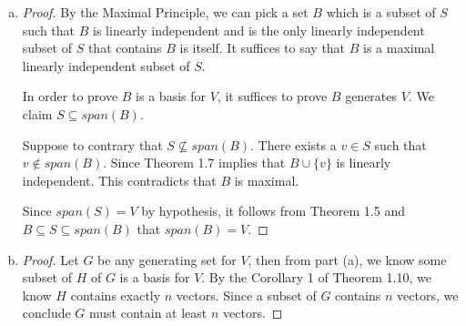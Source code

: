 \begin{Exercise}
	\begin{enumerate}[(a)]
		\item
		\begin{proof}
			By the Maximal Principle, we can pick a set $B$ which is a subset of $S$ such that $B$ is linearly independent and is the only linearly independent subset of $S$ that contains $B$ is itself. It suffices to say that $B$ is a maximal linearly independent subset of $S$.
			
			In order to prove $B$ is a basis for $V$, it suffices to prove $B$ generates $V$. We claim $S\subseteq span(B)$.
			
			Suppose to contrary that $S\nsubseteq span(B)$. There exists a $v\in S$ such that $v\notin span(B)$. Since Theorem 1.7 implies that $B\cup \{v\}$ is linearly independent. This contradicts that $B$ is maximal.
			
			Since $span(S) = V$ by hypothesis, it follows from Theorem 1.5 and $B\subseteq S\subseteq span(B)$ that $span(B) = V$.
		\end{proof}
		
		\item
		\begin{proof}
			Let $G$ be any generating set for $V$, then from part (a), we know some subset of $H$ of $G$ is a basis for $V$. By the Corollary 1 of Theorem 1.10, we know $H$ contains exactly $n$ vectors. Since a subset of $G$ contains $n$ vectors, we conclude $G$ must contain at least $n$ vectors. 
		\end{proof}
	\end{enumerate}
\end{Exercise}